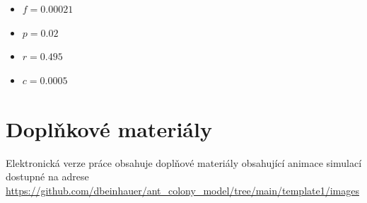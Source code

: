 \documentclass[10pt,a4paper,twocolumn]{article}
\begin{document}
\begin{itemize}
  \item $f = 0.00021$
  \item $p = 0.02$
  \item $r = 0.495$
  \item $c = 0.0005$
\end{itemize}





\section*{Doplňkové materiály}
Elektronická verze práce obsahuje doplňové materiály obsahující
animace simulací dostupné na adrese
\url{https://github.com/dbeinhauer/ant_colony_model/tree/main/template1/images}
\end{document}
